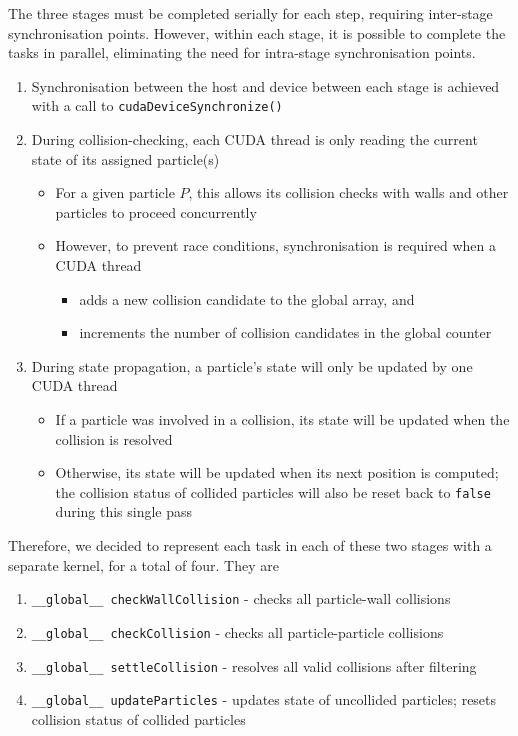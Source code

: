 \documentclass[12pt]{article}
\begin{document}
The three stages must be completed serially for each step, requiring inter-stage synchronisation points. However, within each stage, it is possible to complete the tasks in parallel, eliminating the need for intra-stage synchronisation points.
\begin{enumerate}
    \item Synchronisation between the host and device between each stage is achieved with a call to \texttt{cudaDeviceSynchronize()}
    \item During collision-checking, each CUDA thread is only reading the current state of its assigned particle(s)
        \begin{itemize}
            \item For a given particle $P$, this allows its collision checks with walls and other particles to proceed concurrently
            \item However, to prevent race conditions, synchronisation is required when a CUDA thread
            \begin{itemize}
                \item adds a new collision candidate to the global array, and
                \item increments the number of collision candidates in the global counter
            \end{itemize}
        \end{itemize}
    \item During state propagation, a particle's state will only be updated by one CUDA thread
        \begin{itemize}
            \item If a particle was involved in a collision, its state will be updated when the collision is resolved
            \item Otherwise, its state will be updated when its next position is computed; the collision status of collided particles will also be reset back to \texttt{false} during this single pass
        \end{itemize}
\end{enumerate}

Therefore, we decided to represent each task in each of these two stages with a separate kernel, for a total of four. They are 
\begin{enumerate}
    \item \texttt{\_\_global\_\_ checkWallCollision} - checks all particle-wall collisions
    \item \texttt{\_\_global\_\_ checkCollision} - checks all particle-particle collisions
    \item \texttt{\_\_global\_\_ settleCollision} - resolves all valid collisions after filtering
    \item \texttt{\_\_global\_\_ updateParticles} - updates state of uncollided particles; resets collision status of collided particles
\end{enumerate}
\end{document}

